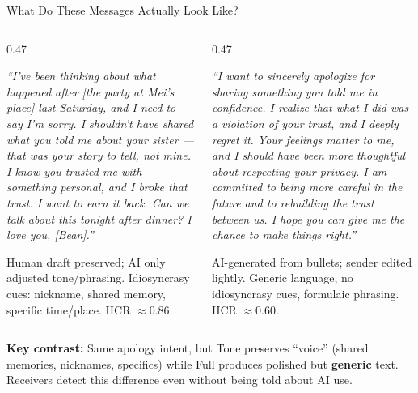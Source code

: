 \documentclass[10pt,aspectratio=169]{beamer}
\newcommand{\emphmark}[1]{\textcolor{chiAccent}{\textbf{#1}}}
\begin{document}

\begin{frame}{What Do These Messages Actually Look Like?}
\vspace{1pt}
\begin{columns}[T]
\scriptsize
\begin{column}{0.47\textwidth}
  \begin{examplebox}
  \footnotesize\itshape
  ``I've been thinking about what happened after [the party at Mei's place] last Saturday, and I need to say I'm sorry. I shouldn't have shared what you told me about your sister --- that was your story to tell, not mine. I know you trusted me with something personal, and I broke that trust. I want to earn it back. Can we talk about this tonight after dinner? I love you, [Bean].''
  \end{examplebox}
  \vspace{2pt}
  {\scriptsize\textcolor{chiGray}{Human draft preserved; AI only adjusted tone/phrasing. Idiosyncrasy cues: nickname, shared memory, specific time/place. HCR $\approx 0.86$.}}
\end{column}
\begin{column}{0.47\textwidth}
  \begin{examplebox}
  \footnotesize\itshape
  ``I want to sincerely apologize for sharing something you told me in confidence. I realize that what I did was a violation of your trust, and I deeply regret it. Your feelings matter to me, and I should have been more thoughtful about respecting your privacy. I am committed to being more careful in the future and to rebuilding the trust between us. I hope you can give me the chance to make things right.''
  \end{examplebox}
  \vspace{2pt}
  {\scriptsize\textcolor{chiRed}{AI-generated from bullets; sender edited lightly. Generic language, no idiosyncrasy cues, formulaic phrasing. HCR $\approx 0.60$.}}
\end{column}
\end{columns}
\vspace{4pt}
\begin{findingbox}
\scriptsize
\textbf{Key contrast:} Same apology intent, but Tone preserves ``voice'' (shared memories, nicknames, specifics) while Full produces polished but \emphmark{generic} text. Receivers detect this difference even without being told about AI use.
\end{findingbox}
\end{frame}
\end{document}
